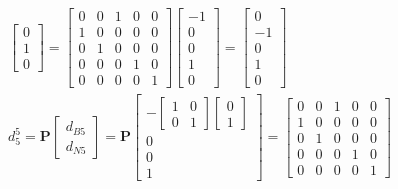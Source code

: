 \documentclass[11pt]{article}
\begin{document}
\begin{enumerate}
\begin{align*}
\begin{bmatrix}
        0 \\ 1 \\ 0
      \end{bmatrix}
      = 
      \begin{bmatrix}
        0 & 0 & 1 & 0 & 0 \\
        1 & 0 & 0 & 0 & 0 \\
        0 & 1 & 0 & 0 & 0 \\
        0 & 0 & 0 & 1 & 0 \\
        0 & 0 & 0 & 0 & 1
      \end{bmatrix}
      \begin{bmatrix}
        -1 \\ 0 \\ 0 \\ 1 \\ 0
      \end{bmatrix}
      =
      \begin{bmatrix}
        0 \\ -1 \\ 0 \\ 1 \\ 0
      \end{bmatrix}
      \\
      d_5^5 = \textbf{P}
      \begin{bmatrix}
         d_{B5} \\ d_{N5}
      \end{bmatrix}
      =
      \textbf{P}
      \begin{bmatrix}
        -
        \begin{bmatrix}
         1 & 0 \\ 0 & 1   
        \end{bmatrix}
        \begin{bmatrix}
            0 \\ 1
        \end{bmatrix} \\
        0 \\ 0 \\ 1
      \end{bmatrix}
      = 
      \begin{bmatrix}
        0 & 0 & 1 & 0 & 0 \\
        1 & 0 & 0 & 0 & 0 \\
        0 & 1 & 0 & 0 & 0 \\
        0 & 0 & 0 & 1 & 0 \\
        0 & 0 & 0 & 0 & 1
      \end{bmatrix}

\end{align*}
\end{enumerate}
\end{document}
